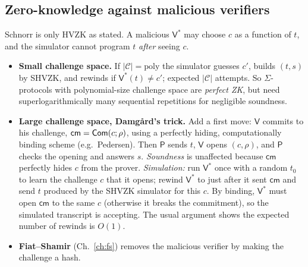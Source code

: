 \documentclass[11pt,a4paper]{report}
\theoremstyle{plain}
\theoremstyle{definition}
\theoremstyle{remark}
\newcommand{\poly}{\mathrm{poly}}
\newcommand{\Prv}{\mathsf{P}}\newcommand{\Ver}{\mathsf{V}}
\begin{document}
\begin{center}
\end{center}

\subsection{Zero-knowledge against malicious verifiers}
Schnorr is only HVZK as stated. A malicious $\Ver^*$ may choose $c$ as a function of $t$, and the simulator cannot program $t$ \emph{after} seeing $c$.
\begin{itemize}
\item \textbf{Small challenge space.} If $|\mathcal C|=\poly$ the simulator guesses $c'$, builds $(t,s)$ by SHVZK, and rewinds if $\Ver^*(t)\ne c'$; expected $|\mathcal C|$ attempts. So $\Sigma$-protocols with polynomial-size challenge space are \emph{perfect ZK}, but need superlogarithmically many sequential repetitions for negligible soundness. 
\item \textbf{Large challenge space, Damgård's trick.} Add a first move: $\Ver$ commits to his challenge, $\mathsf{cm}=\mathsf{Com}(c;\rho)$, using a perfectly hiding, computationally binding scheme (e.g.\ Pedersen). Then $\Prv$ sends $t$, $\Ver$ opens $(c,\rho)$, and $\Prv$ checks the opening and answers $s$. \emph{Soundness} is unaffected because $\mathsf{cm}$ perfectly hides $c$ from the prover. \emph{Simulation:} run $\Ver^*$ once with a random $t_0$ to learn the challenge $c$ that it opens; rewind $\Ver^*$ to just after it sent $\mathsf{cm}$ and send $t$ produced by the SHVZK simulator for this $c$. By binding, $\Ver^*$ must open $\mathsf{cm}$ to the same $c$ (otherwise it breaks the commitment), so the simulated transcript is accepting. The usual argument shows the expected number of rewinds is $O(1)$.
\item \textbf{Fiat--Shamir} (Ch.~\ref{ch:fs}) removes the malicious verifier by making the challenge a hash.
\end{itemize}
\end{document}
